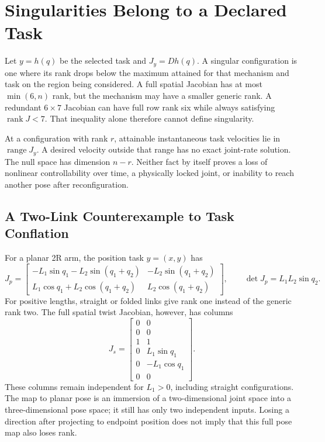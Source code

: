 \section{Singularities Belong to a Declared Task}
\label{sec:singularities}
\label{subsec:singularity_types}

Let $y=h(q)$ be the selected task and $J_y=Dh(q)$. A singular configuration is one where its rank drops below the maximum attained for that mechanism and task on the region being considered. A full spatial Jacobian has at most $\min(6,n)$ rank, but the mechanism may have a smaller generic rank. A redundant $6\times7$ Jacobian can have full row rank six while always satisfying $\operatorname{rank}J<7$. That inequality alone therefore cannot define singularity.

At a configuration with rank $r$, attainable instantaneous task velocities lie in $\operatorname{range}J_y$. A desired velocity outside that range has no exact joint-rate solution. The null space has dimension $n-r$. Neither fact by itself proves a loss of nonlinear controllability over time, a physically locked joint, or inability to reach another pose after reconfiguration.

\subsection{A Two-Link Counterexample to Task Conflation}

For a planar 2R arm, the position task $y=(x,y)$ has
\begin{equation}
 J_p=\begin{bmatrix}
 -L_1\sin q_1-L_2\sin(q_1+q_2)&-L_2\sin(q_1+q_2)\\
 L_1\cos q_1+L_2\cos(q_1+q_2)&L_2\cos(q_1+q_2)
 \end{bmatrix},\qquad
 \det J_p=L_1L_2\sin q_2.
\end{equation}
For positive lengths, straight or folded links give rank one instead of the generic rank two. The full spatial twist Jacobian, however, has columns
\begin{equation}
 J_s=\begin{bmatrix}
 0&0\\0&0\\1&1\\0&L_1\sin q_1\\0&-L_1\cos q_1\\0&0
 \end{bmatrix}.
\end{equation}
These columns remain independent for $L_1>0$, including straight configurations. The map to planar pose is an immersion of a two-dimensional joint space into a three-dimensional pose space; it still has only two independent inputs. Losing a direction after projecting to endpoint position does not imply that this full pose map also loses rank.

